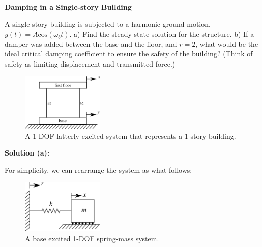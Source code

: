 \documentclass[12pt,letter]{article}
\begin{document}
		\begin{example}
			\textbf{Damping in a Single-story Building}
		
			\noindent  A single-story building is subjected to a harmonic ground motion, $\ddot{y}(t) = A \text{cos}(\omega_b t)$. a) Find the steady-state solution for the structure.  b) If a damper was added between the base and the floor, and $r=2$, what would be the ideal critical damping coefficient to ensure the safety of the building? (Think of safety as limiting displacement and transmitted force.) 
			\begin{figure}[H]
				\centering
				\includegraphics[width=0.35\textwidth]{../figures/base_excited_structure.png}
				\caption{A 1-DOF latterly excited system that represents a 1-story building. }
			\end{figure}				
						
			\noindent\textbf{Solution (a):}
				
			\noindent  For simplicity, we can rearrange the system as what follows:
			\begin{figure}[H]
				\centering
				\includegraphics[width=0.35\textwidth]{../figures/base_excited_structure_simple.png}
				\caption{A base excited 1-DOF spring-mass system.}
			\end{figure}			


\end{example}
\end{document}
